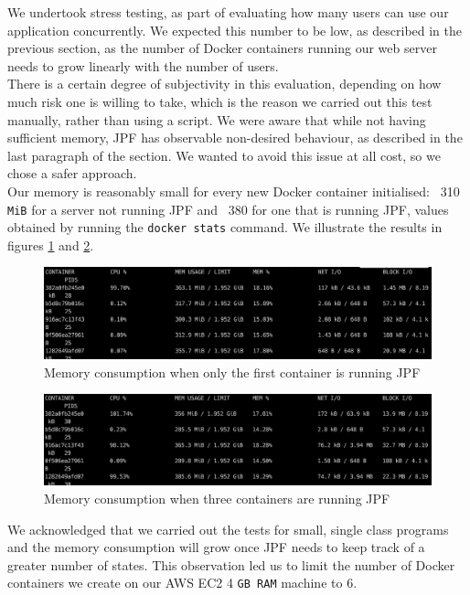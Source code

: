 \documentclass[titlepage,11pt]{article}
\begin{document}
We undertook stress testing, as part of evaluating how many users can use our application concurrently. We expected this number to be low, as described in the previous section, as the number of Docker containers running our web server needs to grow linearly with the number of users. \\

There is a certain degree of subjectivity in this evaluation, depending on how much risk one is willing to take, which is the reason we carried out this test manually, rather than using a script. We were aware that while not having sufficient memory, JPF has observable non-desired behaviour, as described in the last paragraph of the section. We wanted to avoid this issue at all cost, so we chose a safer approach. \\

Our memory is reasonably small for every new Docker container initialised: ~310 \texttt{MiB} for a server not running JPF and ~380 for one that is running JPF, values obtained by running the \texttt{docker stats} command. We illustrate the results in figures \ref{fig:onejpf} and \ref{fig:threejpfs}. \\


\begin{figure} [H]
\centering
\includegraphics[scale=0.6]{onejpf.png}
\caption{Memory consumption when only the first container is running JPF}
\label{fig:onejpf}
\end{figure}

\begin{figure} [H]
\centering
\includegraphics[scale=0.6]{threejpfs.png}
\caption{Memory consumption when three containers are running JPF}
\label{fig:threejpfs}
\end{figure}


We acknowledged that we carried out the tests for small, single class programs and the memory consumption will grow once JPF needs to keep track of a greater number of states. This observation led us to limit the number of Docker containers we create on our AWS EC2 4 \texttt{GB RAM} machine to 6. \\
\end{document}
